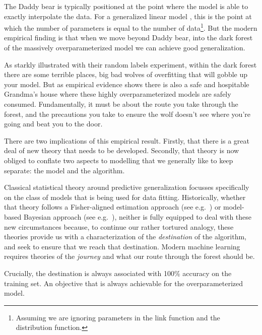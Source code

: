 \documentclass[a4paperpaper,]{article}
\begin{document}
The Daddy bear is typically positioned at the point where the model is
able to exactly interpolate the data. For a generalized linear model
\citep{McCullagh:gen_linear89}, this is the point at which the number of
parameters is equal to the number of data\footnote{Assuming we are
  ignoring parameters in the link function and the distribution
  function.}. But the modern empirical finding is that when we move
beyond Daddy bear, into the dark forest of the massively
overparameterized model we can achieve good generalization.

As \citet{Zhang:understanding17} starkly illustrated with their random
labels experiment, within the dark forest there are some terrible
places, big bad wolves of overfitting that will gobble up your model.
But as empirical evidence shows there is also a safe and hospitable
Grandma's house where these highly overparameterized models are safely
consumed. Fundamentally, it must be about the route you take through the
forest, and the precautions you take to ensure the wolf doesn't see
where you're going and beat you to the door.

There are two implications of this empirical result. Firstly, that there
is a great deal of new theory that needs to be developed. Secondly, that
theory is now obliged to conflate two aspects to modelling that we
generally like to keep separate: the model and the algorithm.

Classical statistical theory around predictive generalization focusses
specifically on the class of models that is being used for data fitting.
Historically, whether that theory follows a Fisher-aligned estimation
approach (see e.g.~\citet{Vapnik:book98}) or model-based Bayesian
approach (see e.g.~\citet{Ghahramani:probabilistic15}), neither is fully
equipped to deal with these new circumstances because, to continue our
rather tortured analogy, these theories provide us with a
characterization of the \emph{destination} of the algorithm, and seek to
ensure that we reach that destination. Modern machine learning requires
theories of the \emph{journey} and what our route through the forest
should be.

Crucially, the destination is always associated with 100\% accuracy on
the training set. An objective that is always achievable for the
overparameterized model.
\end{document}
